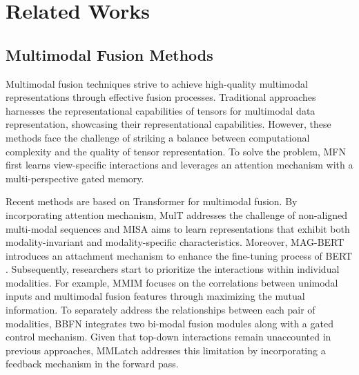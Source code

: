 \documentclass[letterpaper]{article} %
\begin{document}
\section{Related Works}
\subsection{Multimodal Fusion Methods}
Multimodal fusion techniques strive to achieve high-quality multimodal representations through effective fusion processes. Traditional approaches \cite{zadeh2017tensor, liu2018efficient, hou2019deep} harnesses the representational capabilities of tensors for multimodal data representation, showcasing their representational capabilities. However, these methods face the challenge of striking a balance between computational complexity and the quality of tensor representation. To solve the problem, MFN \cite{zadeh2018memory} first learns view-specific interactions and leverages an attention mechanism with a multi-perspective gated memory.

Recent methods are based on Transformer for multimodal fusion. By incorporating attention mechanism, MulT \cite{tsai2019multimodal} addresses the challenge of non-aligned multi-modal sequences and MISA \cite{10.1145/3394171.3413678} aims to learn representations that exhibit both modality-invariant and modality-specific characteristics. Moreover, MAG-BERT \cite{rahman2020integrating} introduces an attachment mechanism to enhance the fine-tuning process of BERT \cite{devlin2018bert}. Subsequently, researchers start to prioritize the interactions within individual modalities. For example, MMIM \cite{han2021improving} focuses on the correlations between unimodal inputs and multimodal fusion features through maximizing the mutual information. To separately address the relationships between each pair of modalities, BBFN \cite{han2021bi} integrates two bi-modal fusion modules along with a gated control mechanism. Given that top-down interactions remain unaccounted in previous approaches, MMLatch \cite{paraskevopoulos2022mmlatch} addresses this limitation by incorporating a feedback mechanism in the forward pass.
\end{document}

